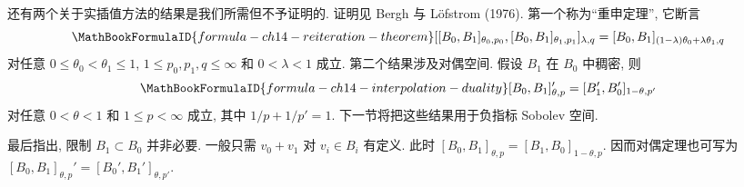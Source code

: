 还有两个关于实插值方法的结果是我们所需但不予证明的. 证明见 Bergh 与 Löfstrom (1976). 第一个称为``重申定理'', 它断言
\begin{equation}
\MathBookFormulaID{formula-ch14-reiteration-theorem}
\label{eq:ch14-reiteration-theorem}
[[B_0,B_1]_{\theta_0,p_0},[B_0,B_1]_{\theta_1,p_1}]_{\lambda,q}
=[B_0,B_1]_{(1-\lambda)\theta_0+\lambda\theta_1,q}
\end{equation}
对任意 $0\leq\theta_0<\theta_1\leq1$, $1\leq p_0,p_1,q\leq\infty$ 和 $0<\lambda<1$ 成立. 第二个结果涉及对偶空间. 假设 $B_1$ 在 $B_0$ 中稠密, 则
\begin{equation}
\MathBookFormulaID{formula-ch14-interpolation-duality}
\label{eq:ch14-interpolation-duality}
[B_0,B_1]_{\theta,p}'=[B_1',B_0']_{1-\theta,p'}
\end{equation}
对任意 $0<\theta<1$ 和 $1\leq p<\infty$ 成立, 其中 $1/p+1/p'=1$. 下一节将把这些结果用于负指标 Sobolev 空间.

最后指出, 限制 $B_1\subset B_0$ 并非必要. 一般只需 $v_0+v_1$ 对 $v_i\in B_i$ 有定义. 此时
$[B_0,B_1]_{\theta,p}=[B_1,B_0]_{1-\theta,p}$. 因而对偶定理也可写为
$[B_0,B_1]_{\theta,p}'=[B_0',B_1']_{\theta,p'}$.
